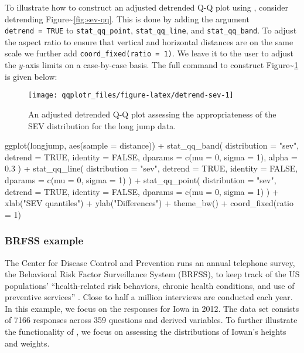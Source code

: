 \label{sec:detrending}

To illustrate how to construct an adjusted detrended Q-Q plot using
, consider detrending
Figure\textasciitilde{}\ref{fig:sev-qq}. This is done by adding the
argument \texttt{detrend\ =\ TRUE} to \texttt{stat\_qq\_point},
\texttt{stat\_qq\_line}, and \texttt{stat\_qq\_band}. To adjust the
aspect ratio to ensure that vertical and horizontal distances are on the
same scale we further add \texttt{coord\_fixed(ratio\ =\ 1)}. We leave
it to the user to adjust the \(y\)-axis limits on a case-by-case basis.
The full command to construct
Figure\textasciitilde{}\ref{fig:detrend-sev} is given below:

\begin{Schunk}
\begin{figure}

{\centering \texttt{[image: qqplotr\_files/figure-latex/detrend-sev-1]} 

}

\caption[An adjusted detrended Q-Q plot assessing the appropriateness of the SEV distribution for the long jump data]{An adjusted detrended Q-Q plot assessing the appropriateness of the SEV distribution for the long jump data.}\label{fig:detrend-sev}
\end{figure}
\end{Schunk}

\begin{Schunk}
\begin{Sinput}
ggplot(longjump, aes(sample = distance)) +
  stat_qq_band(
    distribution = "sev", 
    detrend = TRUE, 
    identity = FALSE,
    dparams = c(mu = 0, sigma = 1),  
    alpha = 0.3
  ) +
  stat_qq_line(
    distribution = "sev", 
    detrend = TRUE, 
    identity = FALSE,
    dparams = c(mu = 0, sigma = 1)
  ) +
  stat_qq_point(
    distribution = "sev", 
    detrend = TRUE,
    identity = FALSE,
    dparams = c(mu = 0, sigma = 1)
  ) +
  xlab("SEV quantiles") +
  ylab("Differences") +
  theme_bw() +
  coord_fixed(ratio = 1)
\end{Sinput}
\end{Schunk}

\subsubsection{BRFSS example}\label{brfss-example}

\label{sec:brfss}

The Center for Disease Control and Prevention runs an annual telephone
survey, the Behavioral Risk Factor Surveillance System (BRFSS), to keep
track of the US populations' ``health-related risk behaviors, chronic
health conditions, and use of preventive services'' \citep{brfss}. Close
to half a million interviews are conducted each year. In this example,
we focus on the responses for Iowa in 2012. The data set consists of
7166 responses across 359 questions and derived variables. To further
illustrate the functionality of , we focus on assessing the
distributions of Iowan's heights and weights.

